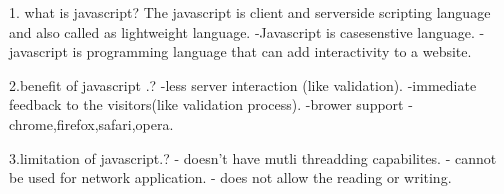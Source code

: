 1. what is javascript?
    The javascript is client and serverside scripting language and also called as lightweight language.
    -Javascript is casesenstive language.
    -javascript is programming language that can add interactivity to a website.

2.benefit of javascript .?
    -less server interaction (like validation).
    -immediate feedback to the visitors(like validation process).
    -brower support -chrome,firefox,safari,opera.
    
3.limitation of javascript.?
    - doesn't have mutli threadding capabilites.
    - cannot be used for network application.
    - does not allow the reading or writing.